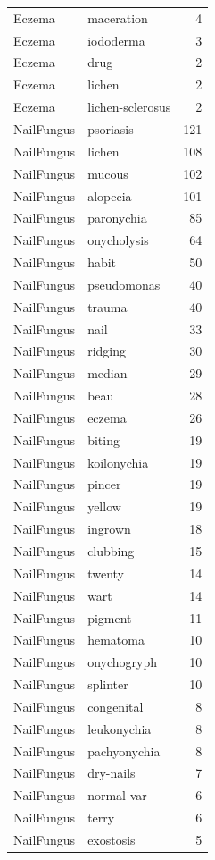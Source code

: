 \begin{tabular}{llr}
Eczema & maceration & 4 \\
Eczema & iododerma & 3 \\
Eczema & drug & 2 \\
Eczema & lichen & 2 \\
Eczema & lichen-sclerosus & 2 \\
NailFungus & psoriasis & 121 \\
NailFungus & lichen & 108 \\
NailFungus & mucous & 102 \\
NailFungus & alopecia & 101 \\
NailFungus & paronychia & 85 \\
NailFungus & onycholysis & 64 \\
NailFungus & habit & 50 \\
NailFungus & pseudomonas & 40 \\
NailFungus & trauma & 40 \\
NailFungus & nail & 33 \\
NailFungus & ridging & 30 \\
NailFungus & median & 29 \\
NailFungus & beau & 28 \\
NailFungus & eczema & 26 \\
NailFungus & biting & 19 \\
NailFungus & koilonychia & 19 \\
NailFungus & pincer & 19 \\
NailFungus & yellow & 19 \\
NailFungus & ingrown & 18 \\
NailFungus & clubbing & 15 \\
NailFungus & twenty & 14 \\
NailFungus & wart & 14 \\
NailFungus & pigment & 11 \\
NailFungus & hematoma & 10 \\
NailFungus & onychogryph & 10 \\
NailFungus & splinter & 10 \\
NailFungus & congenital & 8 \\
NailFungus & leukonychia & 8 \\
NailFungus & pachyonychia & 8 \\
NailFungus & dry-nails & 7 \\
NailFungus & normal-var & 6 \\
NailFungus & terry & 6 \\
NailFungus & exostosis & 5 \\

\end{tabular}

